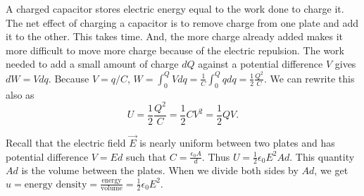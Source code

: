 \begin{remark}
    A charged capacitor stores electric energy equal to the work done to charge it. The net effect of charging a capacitor is to remove charge from one plate and add it to the other. This takes time. And, the more charge already added makes it more difficult to move more charge because of the electric repulsion. The work needed to add a small amount of charge $dQ$ against a potential difference $V$ gives $dW = Vdq$. Because $V = q/C$, $W = \int_0^QVdq = \frac{1}{C}\int_0^Qqdq = \frac{1}{2}\frac{Q^2}{C}.$ We can rewrite this also as $$U = \frac{1}{2}\frac{Q^2}{C}=\frac{1}{2}CV^2=\frac{1}{2}QV.$$
\end{remark}
\begin{definition}
    Recall that the electric field $\vec{E}$ is nearly uniform between two plates and has potential difference $V=Ed$ such that $C = \frac{\epsilon_0A}{d}$. Thus $U = \frac{1}{2}\epsilon_0E^2Ad.$ This quantity $Ad$ is the volume between the plates. When we divide both sides by $Ad$, we get $u = \text{energy density} = \frac{\text{energy}}{\text{volume}}=\frac{1}{2}\epsilon_0E^2.$
\end{definition}

